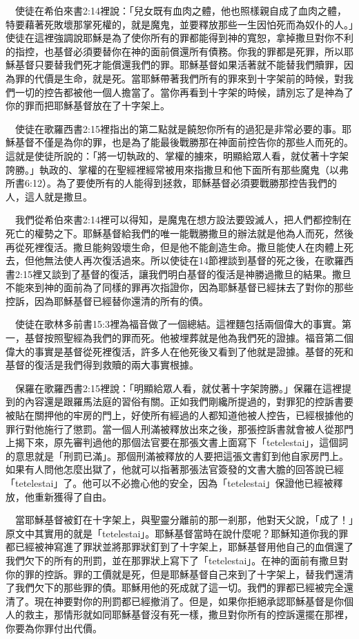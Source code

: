 \documentclass{book}
\begin{document}
　使徒在希伯來書2:14裡說：「兒女既有血肉之體，他也照樣親自成了血肉之體，特要藉著死敗壞那掌死權的，就是魔鬼，並要釋放那些一生因怕死而為奴仆的人。」使徒在這裡強調說耶穌是為了使你所有的罪都能得到神的寬恕，拿掉撒旦對你不利的指控，也基督必須要替你在神的面前償還所有債務。你我的罪都是死罪，所以耶穌基督只要替我們死才能償還我們的罪。耶穌基督如果活著就不能替我們贖罪，因為罪的代價是生命，就是死。當耶穌帶著我們所有的罪來到十字架前的時候，對我們一切的控告都被他一個人擔當了。當你再看到十字架的時候，請別忘了是神為了你的罪而把耶穌基督放在了十字架上。

　使徒在歌羅西書2:15裡指出的第二點就是饒恕你所有的過犯是非常必要的事。耶穌基督不僅是為你的罪，也是為了能最後戰勝那在神面前控告你的那些人而死的。這就是使徒所說的：「將一切執政的、掌權的擄來，明顯給眾人看，就仗著十字架誇勝。」執政的、掌權的在聖經裡經常被用來指撒旦和他下面所有那些魔鬼（以弗所書6:12）。為了要使所有的人能得到拯救，耶穌基督必須要戰勝那控告我們的人，這人就是撒旦。

　我們從希伯來書2:14裡可以得知，是魔鬼在想方設法要毀滅人，把人們都控制在死亡的權勢之下。耶穌基督給我們的唯一能戰勝撒旦的辦法就是他為人而死，然後再從死裡復活。撒旦能夠毀壞生命，但是他不能創造生命。撒旦能使人在肉體上死去，但他無法使人再次復活過來。所以使徒在14節裡談到基督的死之後，在歌羅西書2:15裡又談到了基督的復活，讓我們明白基督的復活是神勝過撒旦的結果。撒旦不能來到神的面前為了同樣的罪再次指證你，因為耶穌基督已經抹去了對你的那些控訴，因為耶穌基督已經替你還清的所有的債。

　使徒在歌林多前書15:3裡為福音做了一個總結。這裡麵包括兩個偉大的事實。第一，基督按照聖經為我們的罪而死。他被埋葬就是他為我們死的證據。福音第二個偉大的事實是基督從死裡復活，許多人在他死後又看到了他就是證據。基督的死和基督的復活是我們得到救贖的兩大事實根據。

　保羅在歌羅西書2:15裡說：「明顯給眾人看，就仗著十字架誇勝。」保羅在這裡提到的內容還是跟羅馬法庭的習俗有關。正如我們剛纔所提過的，對罪犯的控訴書要被貼在關押他的牢房的門上，好使所有經過的人都知道他被人控告，已經根據他的罪行對他施行了懲罰。當一個人刑滿被釋放出來之後，那張控訴書就會被人從那門上揭下來，原先審判過他的那個法官要在那張文書上面寫下「tetelestai」，這個詞的意思就是「刑罰已滿」。那個刑滿被釋放的人要把這張文書釘到他自家房門上。如果有人問他怎麼出獄了，他就可以指著那張法官簽發的文書大膽的回答說已經「tetelestai」了。他可以不必擔心他的安全，因為「tetelestai」保證他已經被釋放，他重新獲得了自由。

　當耶穌基督被釘在十字架上，與聖靈分離前的那一剎那，他對天父說，「成了！」原文中其實用的就是「tetelestai」。耶穌基督當時在說什麼呢？耶穌知道你我的罪都已經被神寫進了罪狀並將那罪狀釘到了十字架上，耶穌基督用他自己的血償還了我們欠下的所有的刑罰，並在那罪狀上寫下了「tetelestai」。在神的面前有撒旦對你的罪的控訴。罪的工價就是死，但是耶穌基督自己來到了十字架上，替我們還清了我們欠下的那些罪的債。耶穌用他的死成就了這一切。我們的罪都已經被完全還清了。現在神要對你的刑罰都已經撤消了。但是，如果你拒絕承認耶穌基督是你個人的救主，那情形就如同耶穌基督沒有死一樣，撒旦對你所有的控訴還擺在那裡，你要為你罪付出代價。
\end{document}
